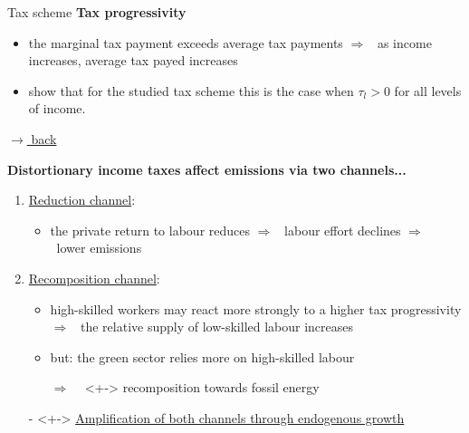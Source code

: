 \documentclass[11pt,aspectratio=169]{beamer}
\newcommand{\ar}{$\Rightarrow$ \ }
\begin{document}
\appendix

\begin{frame}{Tax scheme}
	\hypertarget{taxsc}{}
\textbf{Tax progressivity}
\begin{itemize}
	\item the marginal tax payment exceeds average tax payments \ar as income increases, average tax payed increases
	\item \cite{Heathcote2017OptimalFramework} show that for the studied tax scheme this is the case when $\tau_l>0$ for all levels of income. 
\end{itemize}

\vspace{0mm}
\hfill
\hyperlink{backhh}{\tiny{$\rightarrow$ back}}
\end{frame}


\begin{frame}	\alert{\textbf{Distortionary income taxes affect emissions via two channels...}}
	\pause
	\vspace{4mm}
	\begin{enumerate}
		\item<+-> \underline{Reduction channel}: 
		\vspace{2mm}
		\begin{itemize}
			\item<+-> the private return to labour reduces \ar labour effort declines \ar lower emissions %
		\end{itemize}
		\vspace{3mm}
		\item<+-> \underline{Recomposition channel}:
		\vspace{2mm}
		\begin{itemize}
			\item<+->  high-skilled workers may react more strongly to a higher tax progressivity \\ \ar the relative supply of low-skilled labour increases
			\item<+-> but: the green sector relies more on high-skilled labour \citep{Consoli2016DoCapital}
			\item[\ar]<+-> recomposition towards fossil energy
		\end{itemize}
		\vspace{3mm}
		\item[-]<+-> \underline{Amplification of both channels through endogenous growth}
	\end{enumerate}
\end{frame}
\end{document}
